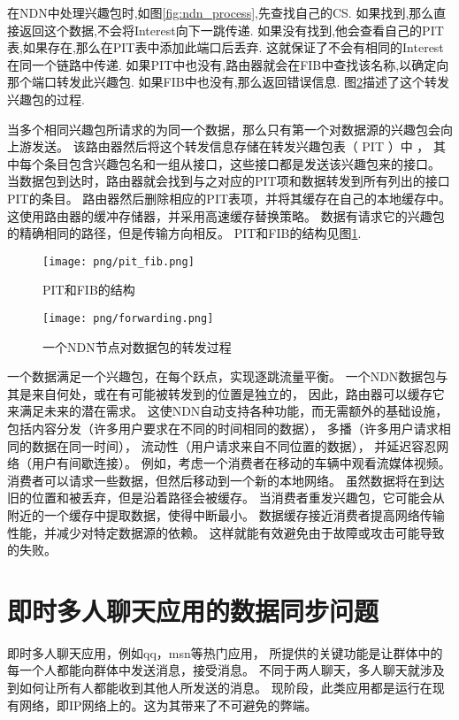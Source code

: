 在NDN中处理兴趣包时,如图\ref{fig:ndn_process},先查找自己的CS.
如果找到,那么直接返回这个数据,不会将Interest向下一跳传递.
如果没有找到,他会查看自己的PIT表,如果存在,那么在PIT表中添加此端口后丢弃.
这就保证了不会有相同的Interest在同一个链路中传递.
如果PIT中也没有,路由器就会在FIB中查找该名称,以确定向那个端口转发此兴趣包.
如果FIB中也没有,那么返回错误信息.
图\ref{fig:forwarding}描述了这个转发兴趣包的过程.

当多个相同兴趣包所请求的为同一个数据，那么只有第一个对数据源的兴趣包会向上游发送。
该路由器然后将这个转发信息存储在转发兴趣包表（ PIT ）中 ，
其中每个条目包含兴趣包名和一组从接口，这些接口都是发送该兴趣包来的接口。
当数据包到达时，路由器就会找到与之对应的PIT项和数据转发到所有列出的接口PIT的条目。
路由器然后删除相应的PIT表项，并将其缓存在自己的本地缓存中。
这使用路由器的缓冲存储器，并采用高速缓存替换策略。
数据有请求它的兴趣包的精确相同的路径，但是传输方向相反。
PIT和FIB的结构见图\ref{fig:pit_fib}.

\begin{figure}
\centering
\texttt{[image: png/pit\_fib.png]}
\caption{PIT和FIB的结构}
\label{fig:pit_fib}
\end{figure}

\begin{figure}
\centering
\texttt{[image: png/forwarding.png]}
\caption{一个NDN节点对数据包的转发过程}
\label{fig:forwarding}
\end{figure}


一个数据满足一个兴趣包，在每个跃点，实现逐跳流量平衡。
一个NDN数据包与其是来自何处，或在有可能被转发到的位置是独立的，
因此，路由器可以缓存它来满足未来的潜在需求。
这使NDN自动支持各种功能，而无需额外的基础设施，
包括内容分发（许多用户要求在不同的时间相同的数据），
多播（许多用户请求相同的数据在同一时间），
流动性（用户请求来自不同位置的数据），
并延迟容忍网络（用户有间歇连接）。
例如，考虑一个消费者在移动的车辆中观看流媒体视频。
消费者可以请求一些数据，但然后移动到一个新的本地网络。
虽然数据将在到达旧的位置和被丢弃，但是沿着路径会被缓存。
当消费者重发兴趣包，它可能会从附近的一个缓存中提取数据，使得中断最小。
数据缓存接近消费者提高网络传输性能，并减少对特定数据源的依赖。
这样就能有效避免由于故障或攻击可能导致的失败。

\section{即时多人聊天应用的数据同步问题}

即时多人聊天应用，例如qq，msn等热门应用，
所提供的关键功能是让群体中的每一个人都能向群体中发送消息，接受消息。
不同于两人聊天，多人聊天就涉及到如何让所有人都能收到其他人所发送的消息。
现阶段，此类应用都是运行在现有网络，即IP网络上的。这为其带来了不可避免的弊端。

